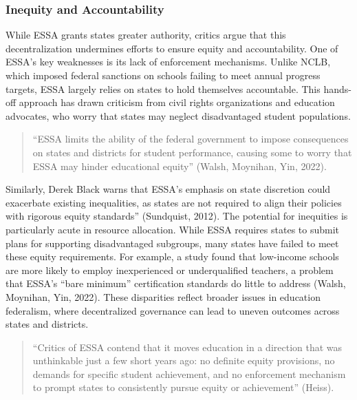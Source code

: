 \documentclass[11pt]{extarticle}
\begin{document}
\subsubsection{Inequity and Accountability}
While ESSA grants states greater authority, critics argue that this decentralization undermines efforts to ensure equity and accountability. One of ESSA’s key weaknesses is its lack of enforcement mechanisms. Unlike NCLB, which imposed federal sanctions on schools failing to meet annual progress targets, ESSA largely relies on states to hold themselves accountable. This hands-off approach has drawn criticism from civil rights organizations and education advocates, who worry that states may neglect disadvantaged student populations.
\begin{quote}
  ``ESSA limits the ability of the federal government to impose consequences on states and districts for student performance, causing some to worry that ESSA may hinder educational equity” (Walsh, Moynihan, Yin, 2022). 
\end{quote}
Similarly, Derek Black warns that ESSA’s emphasis on state discretion could exacerbate existing inequalities, as states are not required to align their policies with rigorous equity standards'' (Sundquist, 2012). The potential for inequities is particularly acute in resource allocation. While ESSA requires states to submit plans for supporting disadvantaged subgroups, many states have failed to meet these equity requirements. 
For example, a study found that low-income schools are more likely to employ inexperienced or underqualified teachers, a problem that ESSA’s “bare minimum” certification standards do little to address (Walsh, Moynihan, Yin, 2022). These disparities reflect broader issues in education federalism, where decentralized governance can lead to uneven outcomes across states and districts.
\begin{quote}
“Critics of ESSA contend that it moves education in a direction that was unthinkable just a few short years ago: no definite equity provisions, no demands for specific student achievement, and no enforcement mechanism to prompt states to consistently pursue equity or achievement” (Heiss).
\end{quote}
\end{document}
